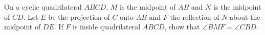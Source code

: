 On a cyclic quadrilateral $ABCD$, $M$ is the midpoint of $AB$ and $N$ is the midpoint of $CD$. Let $E$ be the projection of $C$ onto $AB$ and $F$ the reflection of $N$ about the midpoint of $DE$. If $F$ is inside quadrilateral $ABCD$, show that $\angle BMF = \angle CBD$.